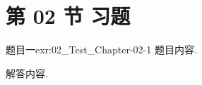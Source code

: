 \section{第 02 节 习题}


\begin{exercise}{题目一}{exr:02_Test_Chapter-02-1}
    题目内容.
\end{exercise}

\begin{solution}
    解答内容.
\end{solution}
